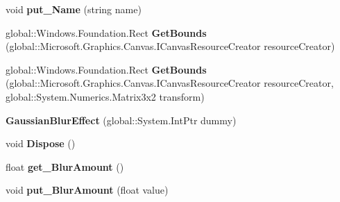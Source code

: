 \begin{DoxyCompactItemize}
\mbox{\label{class_microsoft_1_1_graphics_1_1_canvas_1_1_effects_1_1_gaussian_blur_effect_a98e8bd16e0d6aef72ae476b241eb79da}} 
void {\bfseries put\+\_\+\+Name} (string name)
\item 
\mbox{\label{class_microsoft_1_1_graphics_1_1_canvas_1_1_effects_1_1_gaussian_blur_effect_a67d0aa0daf4bf8acde189a04deefd508}} 
global\+::\+Windows.\+Foundation.\+Rect {\bfseries Get\+Bounds} (global\+::\+Microsoft.\+Graphics.\+Canvas.\+I\+Canvas\+Resource\+Creator resource\+Creator)
\item 
\mbox{\label{class_microsoft_1_1_graphics_1_1_canvas_1_1_effects_1_1_gaussian_blur_effect_a650b47ec2f52a2c56cdc458ed3800b47}} 
global\+::\+Windows.\+Foundation.\+Rect {\bfseries Get\+Bounds} (global\+::\+Microsoft.\+Graphics.\+Canvas.\+I\+Canvas\+Resource\+Creator resource\+Creator, global\+::\+System.\+Numerics.\+Matrix3x2 transform)
\item 
\mbox{\label{class_microsoft_1_1_graphics_1_1_canvas_1_1_effects_1_1_gaussian_blur_effect_a001441f34b40b123ff0a4f6c0fa5adbb}} 
{\bfseries Gaussian\+Blur\+Effect} (global\+::\+System.\+Int\+Ptr dummy)
\item 
\mbox{\label{class_microsoft_1_1_graphics_1_1_canvas_1_1_effects_1_1_gaussian_blur_effect_a9cea4f6122394e148cdf4a3eb0624aa4}} 
void {\bfseries Dispose} ()
\item 
\mbox{\label{class_microsoft_1_1_graphics_1_1_canvas_1_1_effects_1_1_gaussian_blur_effect_a7b01eda1ee6f9bb08a3c9086d7ef1edb}} 
float {\bfseries get\+\_\+\+Blur\+Amount} ()
\item 
\mbox{\label{class_microsoft_1_1_graphics_1_1_canvas_1_1_effects_1_1_gaussian_blur_effect_a1dcdfb69af9895c2333497a0d1b4edde}} 
void {\bfseries put\+\_\+\+Blur\+Amount} (float value)

\end{DoxyCompactItemize}
